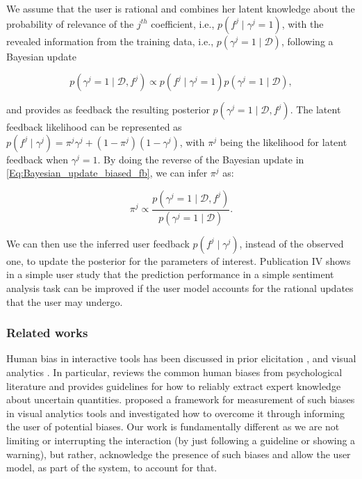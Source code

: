 \documentclass[dissertation,math,vertlayout,pdfa,colorlinks]{aaltoseries}
\newcommand{\bD}{\mathcal{D}}
\begin{document}
We assume that the user is rational and combines her latent knowledge about the probability of relevance of the $j^{th}$ coefficient, i.e., $p(f^{j} \mid \gamma^j=1)$, with the revealed information from the training data, i.e., $p(\gamma^j =1 \mid \bD)$, following a Bayesian update

\begin{equation}\label{Eq:Bayesian_update_biased_fb}
p(\gamma^j=1 \mid \bD, f^{j}) \propto p(f^{j}\mid \gamma^j=1)p(\gamma^j =1\mid \bD),
\end{equation}  

\noindent and provides as feedback the resulting posterior  $p(\gamma^j=1 \mid \bD, f^{j})$. The latent feedback likelihood can be represented as $p(f^{j}\mid \gamma^j) = \pi^j \gamma^j + (1-\pi^j) (1-\gamma^j)$, with $\pi^j$ being the likelihood for latent feedback when $\gamma^j=1$. By doing the reverse of the Bayesian update in \ref{Eq:Bayesian_update_biased_fb}, we can infer $\pi^j$ as:

\begin{equation}\label{Eq:latent_knowledge_infer}
\pi^j \propto \dfrac{p(\gamma^j=1 \mid \bD, f^{j})}{p(\gamma^j =1\mid \bD)}.
\end{equation}  

We can then use the inferred user feedback $p(f^{j}\mid \gamma^j)$, instead of the observed one, to update the posterior for the parameters of interest. Publication IV shows in a simple user study that the prediction performance in a simple sentiment analysis task can be improved if the user model accounts for the rational updates that the user may undergo.

\subsubsection{Related works}

Human bias in interactive tools has been discussed in prior elicitation \cite{garthwaite2005statistical}, and visual analytics \cite{bias_warning}. In particular, \cite{garthwaite2005statistical} reviews the common human biases from psychological literature and provides guidelines for how to reliably extract expert knowledge about uncertain quantities. \cite{bias_warning} proposed a framework for measurement of such biases in visual analytics tools and investigated how to overcome it through informing the user of potential biases. Our work is fundamentally different as we are not limiting or interrupting the interaction (by just following a guideline or showing a warning), but rather, acknowledge the presence of such biases and allow the user model, as part of the system, to account for that.
\end{document}

